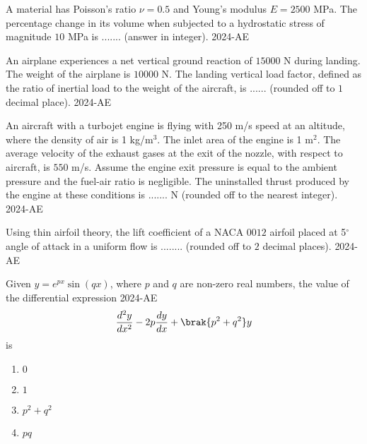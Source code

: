 \item A material has Poisson's ratio $\nu = 0.5$ and Young's modulus $E =2500$ MPa. The percentage change in its volume when subjected to a hydrostatic stress of magnitude $10$ MPa is ....... (answer in integer).
 \hfill{2024-AE}
\item An airplane experiences a net vertical ground reaction of $15000$ N during landing. The weight of the airplane is $10000$ N. The landing vertical load factor, defined as the ratio of inertial load to the weight of the aircraft, is ......  (rounded off to $1$ decimal place).
 \hfill{2024-AE}
\item An aircraft with a turbojet engine is flying with 250 m/s speed at an altitude, where the density of air is 1 kg/m$^3$. The inlet area of the engine is 1 m$^2$. The average velocity of the exhaust gases at the exit of the nozzle, with respect to aircraft, is $550$ m/s. Assume the engine exit pressure is equal to the ambient pressure and the fuel-air ratio is negligible. The uninstalled thrust produced by the engine at these conditions is ....... N (rounded off to the nearest integer).
 \hfill{2024-AE}
\item Using thin airfoil theory, the lift coefficient of a NACA $0012$ airfoil placed at 5$^\circ$ angle of attack in a uniform flow is ........ (rounded off to $2$ decimal places).
 \hfill{2024-AE}
\item Given $y = e^{px} \sin(qx)$, where $p$ and $q$ are non-zero real numbers, the value of the differential expression
 \hfill{2024-AE}
    \begin{align*}
    \frac{d^2 y}{dx^2} - 2p \frac{dy}{dx} + \brak{p^2 + q^2} y
    \end{align*}
    is
    \begin{enumerate}
        \item $0$
        \item $1$
        \item $p^2 + q^2$
        \item $pq$
    \end{enumerate}

